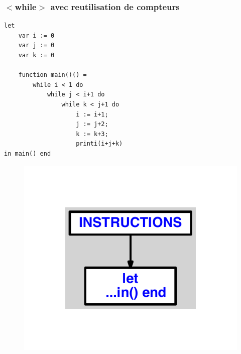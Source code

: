 \documentclass{article}
\begin{document}
\subsubsection{$ < $while$ > $ avec reutilisation de compteurs}
\begin{lstlisting}
let
	var i := 0
	var j := 0
	var k := 0

	function main()() =
		while i < 1 do
			while j < i+1 do
				while k < j+1 do
					i := i+1;
					j := j+2;
					k := k+3;
					printi(i+j+k)
in main() end
\end{lstlisting}
\newpage
\begin{figure}[H]
\centering
\includegraphics[max width=\textwidth]{ast/ast_339.pdf}
\end{figure}
\newpage
\end{document}
